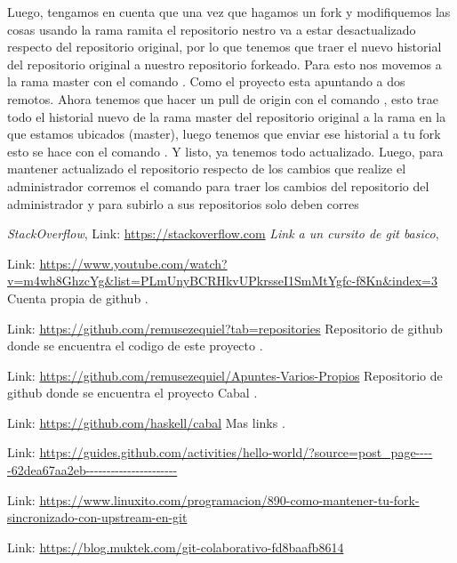 \documentclass[10pt,journal,compsoc]{IEEEtran}
\begin{document}
Luego, tengamos en cuenta que una vez que hagamos un fork y modifiquemos las cosas usando la rama ramita el repositorio nestro va a estar desactualizado respecto del repositorio original, por lo que tenemos que traer el nuevo historial del repositorio original a nuestro repositorio forkeado. Para esto
nos movemos a la rama master con el comando \textit{\color{Blue}{git checkout master}}. Como el proyecto esta apuntando a dos remotos. Ahora tenemos que hacer un pull de origin con el comando \textit{\color{Blue}{git pull origin master}}, esto trae todo el historial nuevo de la rama master del repositorio original a la rama en la que estamos ubicados (master), luego tenemos que enviar ese historial a tu fork esto se hace con el comando \textit{\color{Blue}{git push papasConCheddar master}}. Y listo, ya tenemos todo actualizado. Luego, para mantener actualizado el repositorio respecto de los cambios que realize el administrador corremos el comando \textit{\color{Blue}{git pull origin master}} para traer los cambios del repositorio del administrador y para subirlo a sus repositorios solo deben corres \textit{\color{Blue}{git push origin master}}

\newpage
\begin{thebibliography}{1}
%
 \emph{StackOverflow}, 
 Link: \textcolor{Red}{\url{https://stackoverflow.com}}
%
 \emph{Link a un cursito de git basico}, 
 
 Link: \textcolor{Red}{\url{https://www.youtube.com/watch?v=m4wh8GhzcYg&list=PLmUnyBCRHkvUPkrsseI1SmMtYgfc-f8Kn&index=3}}
Cuenta propia de github \emph{}.

 Link: \textcolor{Red}{\url{https://github.com/remusezequiel?tab=repositories}}
% 
%
Repositorio de github donde se encuentra el codigo de este proyecto  \emph{}.

 Link: \textcolor{Red}{\url{https://github.com/remusezequiel/Apuntes-Varios-Propios}}
% 
%
Repositorio de github donde se encuentra el proyecto Cabal  \emph{}.

 Link: \textcolor{Red}{\url{https://github.com/haskell/cabal}}
% 
%
Mas links  \emph{}.

 Link: \textcolor{Red}{\url{https://guides.github.com/activities/hello-world/?source=post_page-----62dea67aa2eb----------------------}}


 Link: \textcolor{Red}{\url{https://www.linuxito.com/programacion/890-como-mantener-tu-fork-sincronizado-con-upstream-en-git}}

 Link: \textcolor{Red}{\url{https://blog.muktek.com/git-colaborativo-fd8baafb8614}}
\end{thebibliography}
\end{document}
